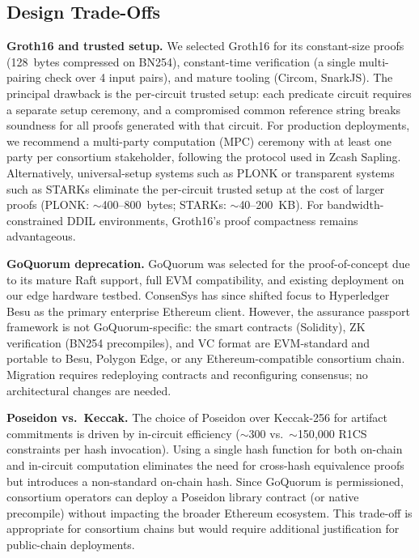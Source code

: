 \subsection{Design Trade-Offs}
\label{sec:discussion-tradeoffs}

\textbf{Groth16 and trusted setup.}
We selected Groth16 for its constant-size proofs (128~bytes compressed on BN254), constant-time verification (a single multi-pairing check over 4 input pairs), and mature tooling (Circom, SnarkJS).
The principal drawback is the per-circuit trusted setup: each predicate circuit requires a separate setup ceremony, and a compromised common reference string breaks soundness for all proofs generated with that circuit.
For production deployments, we recommend a multi-party computation (MPC) ceremony with at least one party per consortium stakeholder, following the protocol used in Zcash Sapling.
Alternatively, universal-setup systems such as PLONK or transparent systems such as STARKs eliminate the per-circuit trusted setup at the cost of larger proofs (PLONK: $\sim$400--800~bytes; STARKs: $\sim$40--200~KB).
For bandwidth-constrained DDIL environments, Groth16's proof compactness remains advantageous.

\textbf{GoQuorum deprecation.}
GoQuorum was selected for the proof-of-concept due to its mature Raft support, full EVM compatibility, and existing deployment on our edge hardware testbed.
ConsenSys has since shifted focus to Hyperledger Besu as the primary enterprise Ethereum client.
However, the assurance passport framework is not GoQuorum-specific: the smart contracts (Solidity), ZK verification (BN254 precompiles), and VC format are EVM-standard and portable to Besu, Polygon Edge, or any Ethereum-compatible consortium chain.
Migration requires redeploying contracts and reconfiguring consensus; no architectural changes are needed.

\textbf{Poseidon vs.\ Keccak.}
The choice of Poseidon over Keccak-256 for artifact commitments is driven by in-circuit efficiency ($\sim$300 vs.\ $\sim$150{,}000 R1CS constraints per hash invocation).
Using a single hash function for both on-chain and in-circuit computation eliminates the need for cross-hash equivalence proofs but introduces a non-standard on-chain hash.
Since GoQuorum is permissioned, consortium operators can deploy a Poseidon library contract (or native precompile) without impacting the broader Ethereum ecosystem.
This trade-off is appropriate for consortium chains but would require additional justification for public-chain deployments.


